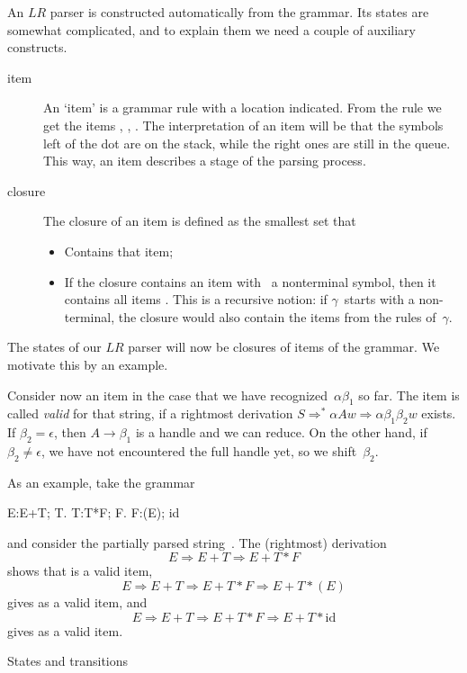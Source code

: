 An $LR$ parser is constructed automatically from the grammar. Its
states are somewhat complicated, and to explain them we need
a couple of auxiliary constructs.
\begin{description}
\item[item] An `item' is a grammar rule
  with a location indicated. From the rule  we get
  the items , , . The interpretation of an item will be that the symbols left
  of the dot are on the stack, while the right ones are still in the
  queue. This way, an item describes a stage of the parsing process.
\item[closure] The closure of an item is defined as
  the smallest set that
\begin{itemize}
\item Contains that item;
\item If the closure contains an item  with~ a nonterminal symbol, then it contains all
  items . This is a recursive notion: if
  $\gamma$~starts with a non-terminal, the closure would also contain
  the items from the rules of~$\gamma$.
\end{itemize}
\end{description}
The states of our $LR$ parser will now be closures of items of the
grammar. We motivate this by an example.

Consider now an item  in the case that
we have recognized~$\alpha\beta_1$ so far. The item is called
\emph{valid} for that string, if a rightmost derivation
$S\Rightarrow^*\alpha Aw\Rightarrow \alpha\beta_1\beta_2w$ exists. If
$\beta_2=\epsilon$, then $A\rightarrow\beta_1$ is a handle and we can
reduce. On the other hand, if $\beta_2\not=\epsilon$, we have not
encountered the full handle yet, so we shift~$\beta_2$.

As an example, take the grammar
\begin{bnf}
E:E+T; T.
T:T*F; F.
F:(E); id
\end{bnf}
and consider the partially parsed string~. The (rightmost)
derivation
\[ E\Rightarrow E+T\Rightarrow E+T*F \]
shows that  is a valid item,
\[ E\Rightarrow E+T\Rightarrow E+T*F\Rightarrow E+T*(E) \]
gives  as a valid item, and
\[ E\Rightarrow E+T\Rightarrow E+T*F\Rightarrow E+T*\mathrm{id} \]
gives  as a valid item.

 {States and transitions}

